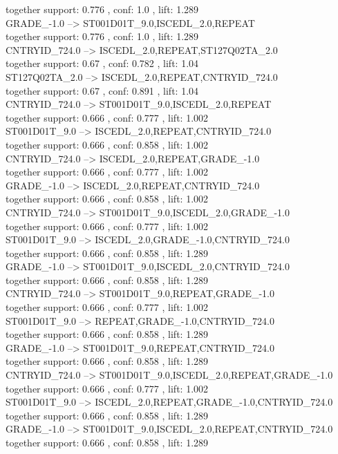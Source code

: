 \documentclass[12pt, a4paper, oneside]{ctexart}
\begin{document}
     together support: 0.776 , conf: 1.0 , lift: 1.289\\
   GRADE\_-1.0 --> ST001D01T\_9.0,ISCEDL\_2.0,REPEAT \\
     together support: 0.776 , conf: 1.0 , lift: 1.289\\
   CNTRYID\_724.0 --> ISCEDL\_2.0,REPEAT,ST127Q02TA\_2.0 \\
     together support: 0.67 , conf: 0.782 , lift: 1.04\\
   ST127Q02TA\_2.0 --> ISCEDL\_2.0,REPEAT,CNTRYID\_724.0 \\
    together support: 0.67 , conf: 0.891 , lift: 1.04\\
   CNTRYID\_724.0 --> ST001D01T\_9.0,ISCEDL\_2.0,REPEAT \\
     together support: 0.666 , conf: 0.777 , lift: 1.002\\
   ST001D01T\_9.0 --> ISCEDL\_2.0,REPEAT,CNTRYID\_724.0\\ 
     together support: 0.666 , conf: 0.858 , lift: 1.002\\
   CNTRYID\_724.0 --> ISCEDL\_2.0,REPEAT,GRADE\_-1.0 \\
     together support: 0.666 , conf: 0.777 , lift: 1.002\\
   GRADE\_-1.0 --> ISCEDL\_2.0,REPEAT,CNTRYID\_724.0 \\
     together support: 0.666 , conf: 0.858 , lift: 1.002\\
   CNTRYID\_724.0 --> ST001D01T\_9.0,ISCEDL\_2.0,GRADE\_-1.0 \\
     together support: 0.666 , conf: 0.777 , lift: 1.002\\
   ST001D01T\_9.0 --> ISCEDL\_2.0,GRADE\_-1.0,CNTRYID\_724.0 \\
    together support: 0.666 , conf: 0.858 , lift: 1.289\\
   GRADE\_-1.0 --> ST001D01T\_9.0,ISCEDL\_2.0,CNTRYID\_724.0 \\
    together support: 0.666 , conf: 0.858 , lift: 1.289\\
   CNTRYID\_724.0 --> ST001D01T\_9.0,REPEAT,GRADE\_-1.0 \\
     together support: 0.666 , conf: 0.777 , lift: 1.002\\
   ST001D01T\_9.0 --> REPEAT,GRADE\_-1.0,CNTRYID\_724.0 \\
    together support: 0.666 , conf: 0.858 , lift: 1.289\\
   GRADE\_-1.0 --> ST001D01T\_9.0,REPEAT,CNTRYID\_724.0 \\
    together support: 0.666 , conf: 0.858 , lift: 1.289\\
   CNTRYID\_724.0 --> ST001D01T\_9.0,ISCEDL\_2.0,REPEAT,GRADE\_-1.0 \\
     together support: 0.666 , conf: 0.777 , lift: 1.002\\
   ST001D01T\_9.0 --> ISCEDL\_2.0,REPEAT,GRADE\_-1.0,CNTRYID\_724.0 \\
    together support: 0.666 , conf: 0.858 , lift: 1.289\\
   GRADE\_-1.0 --> ST001D01T\_9.0,ISCEDL\_2.0,REPEAT,CNTRYID\_724.0 \\
    together support: 0.666 , conf: 0.858 , lift: 1.289\\
\end{document}
